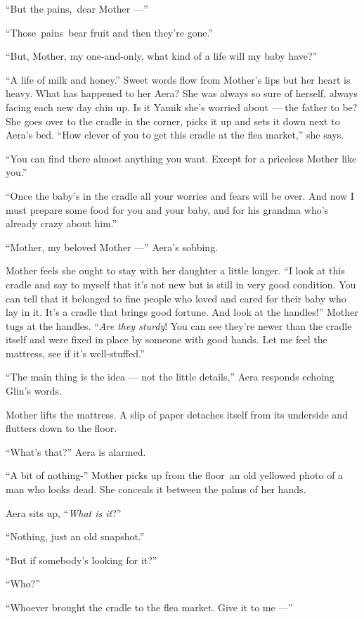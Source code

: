 \documentclass[twoside,11pt,openany]{book}
\begin{document}
``But the pains,~dear Mother ---''

``Those~pains~bear fruit and then they're gone.''

``But, Mother, my one-and-only, what kind of a life will my baby have?''

``A life of milk and honey.'' Sweet words flow from Mother's lips but her heart is heavy. What
has happened to her Aera? She was always so sure of herself, always facing each new day chin up. Is it Yamik she's
worried about --- the father to be? She goes over to the cradle in the corner, picks it up and sets it down next to
Aera's bed. ``How clever of you to get this cradle at the flea market,'' she says.

``You can find there almost anything you want. Except for a priceless Mother like you.''

``Once the baby's in the cradle all your worries and fears will be over. And now I must prepare some food
for you and your baby, and for his grandma who's already crazy about him.''

``Mother, my beloved Mother ---'' Aera's  sobbing.

Mother feels she ought to stay with her daughter a little longer. ``I look at this cradle and say to myself
that it's not new but is{ }still in very good condition. You can tell that it belonged to fine people
who loved and cared for their baby who lay in it. It's a cradle that brings good fortune. And look at the
handles!'' Mother tugs at the handles. ``\textit{Are they sturdy}! You can see they're newer
than the cradle itself and were fixed in place by someone with good hands. Let me feel the mattress, see if it's
well-stuffed.''

``The main thing is the idea --- not the little details,'' Aera responds echoing Glin's words.

Mother lifts the mattress. A slip of paper detaches itself from its underside and{ }flutters down to the
floor.

``What's that?'' Aera is alarmed.

``A bit of nothing-'' Mother picks up from the floor~an old yellowed photo of a man who looks dead. She
conceals{ }it between the palms of her hands.

Aera sits up, ``\textit{What is it}?''

``Nothing, just an old snapshot.''

``But if somebody's looking for it?''

``Who?''

``Whoever brought the cradle to the flea market. Give it to me ---''
\end{document}
